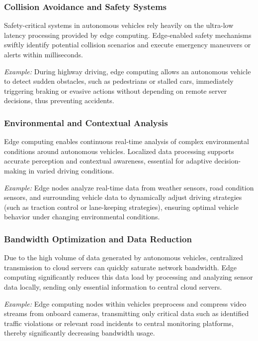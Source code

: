 \documentclass[runningheads]{llncs}
\begin{document}
\subsubsection{Collision Avoidance and Safety Systems}
Safety-critical systems in autonomous vehicles rely heavily on the ultra-low latency processing provided by edge computing. Edge-enabled safety mechanisms swiftly identify potential collision scenarios and execute emergency maneuvers or alerts within milliseconds.

\noindent\textit{Example:} During highway driving, edge computing allows an autonomous vehicle to detect sudden obstacles, such as pedestrians or stalled cars, immediately triggering braking or evasive actions without depending on remote server decisions, thus preventing accidents.

\subsubsection{Environmental and Contextual Analysis}
Edge computing enables continuous real-time analysis of complex environmental conditions around autonomous vehicles. Localized data processing supports accurate perception and contextual awareness, essential for adaptive decision-making in varied driving conditions.

\noindent\textit{Example:} Edge nodes analyze real-time data from weather sensors, road condition sensors, and surrounding vehicle data to dynamically adjust driving strategies (such as traction control or lane-keeping strategies), ensuring optimal vehicle behavior under changing environmental conditions.

\subsubsection{Bandwidth Optimization and Data Reduction}
Due to the high volume of data generated by autonomous vehicles, centralized transmission to cloud servers can quickly saturate network bandwidth. Edge computing significantly reduces this data load by processing and analyzing sensor data locally, sending only essential information to central cloud servers.

\noindent\textit{Example:} Edge computing nodes within vehicles preprocess and compress video streams from onboard cameras, transmitting only critical data such as identified traffic violations or relevant road incidents to central monitoring platforms, thereby significantly decreasing bandwidth usage.
\end{document}

